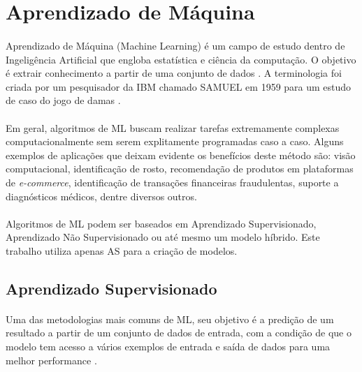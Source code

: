 \section{Aprendizado de Máquina}

\paragraph{} Aprendizado de Máquina (Machine Learning) é um campo de estudo dentro de Ingeligência Artificial \cite{ibm_ai} que engloba estatística e ciência da computação. O objetivo é extrair conhecimento a partir de uma conjunto de dados \cite{muller2016introduction}. A terminologia foi criada por um pesquisador da IBM chamado SAMUEL em 1959 \cite{ibm_ml} para um estudo de caso do jogo de damas \cite{arthur1959some}.

\paragraph{} Em geral, algoritmos de ML buscam realizar tarefas extremamente complexas computacionalmente sem serem explitamente programadas caso a caso. Alguns exemplos de aplicações que deixam evidente os benefícios deste método são: visão computacional, identificação de rosto, recomendação de produtos em plataformas de \textit{e-commerce}, identificação de transações financeiras fraudulentas, suporte a diagnósticos médicos, dentre diversos outros.

\paragraph{} Algoritmos de ML podem ser baseados em Aprendizado Supervisionado, Aprendizado Não Supervisionado ou até mesmo um modelo híbrido. Este trabalho utiliza apenas AS para a criação de modelos.


\subsection{Aprendizado Supervisionado}

\paragraph{} Uma das metodologias mais comuns de ML, seu objetivo é a predição de um resultado a partir de um conjunto de dados de entrada, com a condição de que o modelo tem acesso a vários exemplos de entrada e saída de dados para uma melhor performance \cite{muller2016introduction}.

